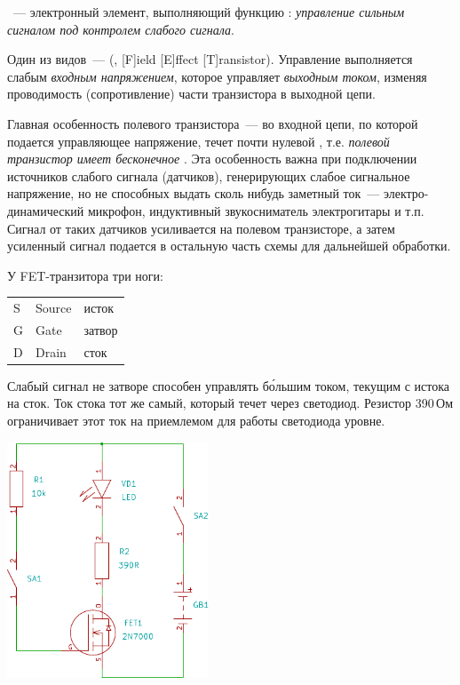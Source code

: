 
\begin{framed}
\ --- электронный элемент, выполняющий функцию
: \emph{управление сильным сигналом под контролем
слабого сигнала}.
\end{framed}

\bigskip
Один из видов\ ---  
(, [F]ield [E]ffect [T]ransistor). Управление выполняется
слабым \emph{входным напряжением}, которое управляет \emph{выходным током},
изменяя проводимость (сопротивление) части транзистора в выходной цепи. 

Главная особенность полевого транзистора\ --- во входной цепи, по которой
подается управляющее напряжение, течет почти нулевой , т.е. \emph{полевой транзистор имеет бесконечное
}. Эта особенность важна
при подключении источников слабого сигнала (датчиков), генерирующих слабое
сигнальное напряжение, но не способных выдать сколь нибудь заметный ток\ ---
электро-динамический микрофон, индуктивный звукосниматель электрогитары и т.п.
Сигнал от таких датчиков усиливается  на полевом транзисторе, а затем усиленный
сигнал подается в остальную часть схемы для дальнейшей обработки.

\bigskip
У FET-транзитора три ноги:

\begin{tabular}{l l l}
S & Source & исток \\
G & Gate & затвор \\
D & Drain & сток \\
\end{tabular}
\bigskip

Слабый сигнал не затворе способен управлять б\'{о}льшим током, текущим с истока
на сток. Ток стока тот же самый, который течет через светодиод. Резистор 390\,Ом
ограничивает этот ток на приемлемом для работы светодиода уровне.

\bigskip
\includegraphics[width=0.45\textwidth]{bcollis/fet/fet.pdf}
\bigskip
